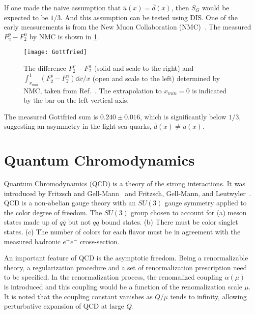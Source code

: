 \documentclass[../main.tex]{subfiles}
\begin{document}
If one made the naive assumption that $\bar{u}\left(x\right)= \bar{d}\left(x\right)$,
then $S_G$ would be expected to be $1/3$. And this assumption can be tested using DIS.
One of the early measurements is from the New Muon Collaboration (NMC)~\cite{amaudruz1991}.
The measured $F_2^p-F_2^n$ by NMC is shown in \cref{fig:NMC_Gottfried}.
\begin{figure}[htbp!]
	\centering
	\texttt{[image: Gottfried]}
	\caption{The difference $F_2^p -F_2^n$ (solid and scale to the right) and
		$\int_{x_{min}}^1 (F_2^p-F_2^n)\dd{x}/x$ (open and scale to the left)
		determined by NMC, taken from Ref.~\cite{amaudruz1991}. The extrapolation
		to $x_{min}=0$ is indicated by the bar on the left vertical axis.}
	\label{fig:NMC_Gottfried}
\end{figure}
The measured Gottfried sum is $0.240 \pm 0.016$, which is significantly below
$1/3$, suggesting an asymmetry in the light sea-quarks, $\bar{d}(x)\neq \bar{u}(x)$.

\section{Quantum Chromodynamics}
\label{sec:QCD}
Quantum Chromodynamics (QCD) is a theory of the strong interactions. It was
introduced by Fritzsch and Gell-Mann~\cite{fritzsch1972} and Fritzsch, Gell-Mann,
and Leutwyler~\cite{fritzsch1973}. QCD is a non-abelian gauge theory with an
$SU(3)$ gauge symmetry applied to the color degree of freedom. The $SU(3)$ group
chosen to account for (a) meson states made up of $q\bar{q}$ but not $qq$ bound states.
(b) There must be color singlet states. (c) The number of colors for each flavor
must be in agreement with the measured hadronic $e^+ e^-$ cross-section.


An important feature of QCD is the asymptotic freedom. Being a renormalizable
theory, a regularization procedure and a set of renormalization prescription
need to be specified. In the renormalization process, the renomalized coupling $\alpha(\mu)$
is introduced and this coupling would be a function of the renomalization scale $\mu$.
It is noted that the coupling constant vanishes as $Q/\mu$ tends to infinity,
allowing perturbative expansion of QCD at large $Q$.
\end{document}
